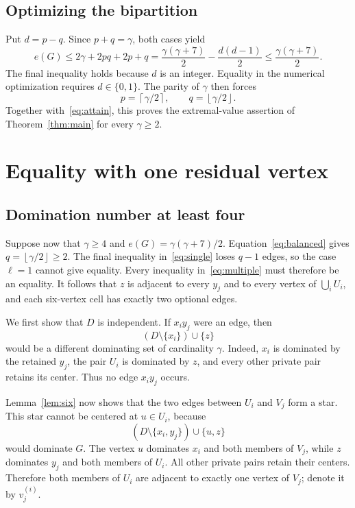 \documentclass[11pt]{article}
\theoremstyle{definition}
\theoremstyle{remark}
\newcommand{\e}{e}
\newcommand{\ceil}[1]{\left\lceil#1\right\rceil}
\newcommand{\floor}[1]{\left\lfloor#1\right\rfloor}
\begin{document}
\subsection{Optimizing the bipartition}

Put $d=p-q$. Since $p+q=\gamma$, both cases yield
\begin{equation}\label{eq:opt}
 \e(G)\le 2\gamma+2pq+2p+q
 =\frac{\gamma(\gamma+7)}2-\frac{d(d-1)}2
 \le\frac{\gamma(\gamma+7)}2.
\end{equation}
The final inequality holds because $d$ is an integer. Equality in the
numerical optimization requires $d\in\{0,1\}$. The parity of $\gamma$
then forces
\begin{equation}\label{eq:balanced}
 p=\ceil{\gamma/2},\qquad q=\floor{\gamma/2}.
\end{equation}
Together with~\eqref{eq:attain}, this proves the extremal-value assertion of
Theorem~\ref{thm:main} for every $\gamma\ge2$.

\section{Equality with one residual vertex}\label{sec:rigidity}

\subsection{Domination number at least four}

Suppose now that $\gamma\ge4$ and
$\e(G)=\gamma(\gamma+7)/2$. Equation~\eqref{eq:balanced} gives
$q=\floor{\gamma/2}\ge2$. The final inequality in~\eqref{eq:single}
loses $q-1$ edges, so the case $\ell=1$ cannot give equality.
Every inequality in~\eqref{eq:multiple} must therefore be an equality.
It follows that $z$ is adjacent to every $y_j$ and to every vertex of
$\bigcup_iU_i$, and each six-vertex cell has exactly two optional edges.

We first show that $D$ is independent. If $x_iy_j$ were an edge, then
\[
 (D\setminus\{x_i\})\cup\{z\}
\]
would be a different dominating set of cardinality $\gamma$.
Indeed, $x_i$ is dominated by the retained $y_j$, the pair $U_i$ is
dominated by $z$, and every other private pair retains its center.
Thus no edge $x_iy_j$ occurs.

Lemma~\ref{lem:six} now shows that the two edges between $U_i$ and $V_j$
form a star. This star cannot be centered at $u\in U_i$, because
\[
 (D\setminus\{x_i,y_j\})\cup\{u,z\}
\]
would dominate $G$. The vertex $u$ dominates $x_i$ and both members of
$V_j$, while $z$ dominates $y_j$ and both members of $U_i$.
All other private pairs retain their centers. Therefore both members of
$U_i$ are adjacent to exactly one vertex of $V_j$; denote it by $v_j^{(i)}$.
\end{document}
